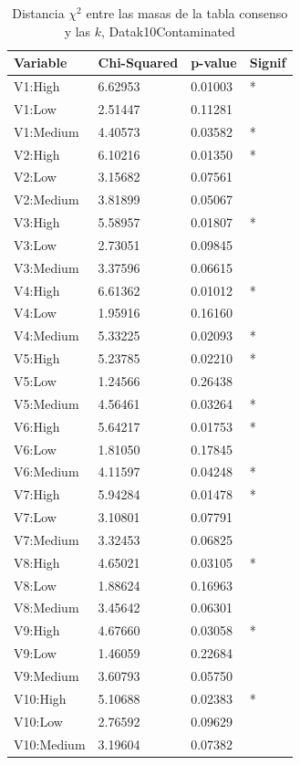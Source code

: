 \documentclass[water,article,submit,moreauthors,pdftex]{mdpi}
\begin{document}
\begin{table}[!ht]
\tiny
\centering
\begin{tabular}{@{}llll@{}}
\toprule
\textbf{Variable} & \textbf{Chi-Squared} & \textbf{p-value} & \textbf{Signif} \\ \midrule
V1:High & 6.62953 & 0.01003 & * \\
V1:Low & 2.51447 & 0.11281 &  \\
V1:Medium & 4.40573 & 0.03582 & * \\
V2:High & 6.10216 & 0.01350 & * \\
V2:Low & 3.15682 & 0.07561 &  \\
V2:Medium & 3.81899 & 0.05067 &  \\
V3:High & 5.58957 & 0.01807 & * \\
V3:Low & 2.73051 & 0.09845 &  \\
V3:Medium & 3.37596 & 0.06615 &  \\
V4:High & 6.61362 & 0.01012 & * \\
V4:Low & 1.95916 & 0.16160 &  \\
V4:Medium & 5.33225 & 0.02093 & * \\
V5:High & 5.23785 & 0.02210 & * \\
V5:Low & 1.24566 & 0.26438 &  \\
V5:Medium & 4.56461 & 0.03264 & * \\
V6:High & 5.64217 & 0.01753 & * \\
V6:Low & 1.81050 & 0.17845 &  \\
V6:Medium & 4.11597 & 0.04248 & * \\
V7:High & 5.94284 & 0.01478 & * \\
V7:Low & 3.10801 & 0.07791 &  \\
V7:Medium & 3.32453 & 0.06825 &  \\
V8:High & 4.65021 & 0.03105 & * \\
V8:Low & 1.88624 & 0.16963 &  \\
V8:Medium & 3.45642 & 0.06301 &  \\
V9:High & 4.67660 & 0.03058 & * \\
V9:Low & 1.46059 & 0.22684 &  \\
V9:Medium & 3.60793 & 0.05750 &  \\
V10:High & 5.10688 & 0.02383 & * \\
V10:Low & 2.76592 & 0.09629 &  \\
V10:Medium & 3.19604 & 0.07382 & 
\end{tabular}

\caption{Distancia $\chi^2$ entre las masas de la tabla consenso y las $k$, Datak10Contaminated}

\label{tab:chi}
\end{table}
\end{document}

